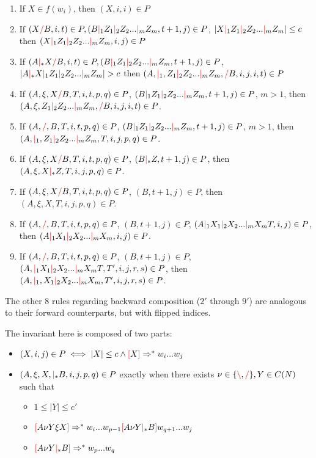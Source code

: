 \documentclass[12pt]{extarticle}
\theoremstyle{definition} \newtheorem{defn}{Definition}
\theoremstyle{definition} \newtheorem{prop}{Proposition}
\newcommand{\lc}{\textcolor{red}{\backslash}}
\newcommand{\rc}{\textcolor{red}{/}}
\newcommand{\mc}{\textcolor{red}{|}}
\newcommand{\lb}{\textcolor{red}{[}}
\newcommand{\rb}{\textcolor{red}{]}}
\begin{document}
\begin{enumerate}
    \item If $X \in f(w_i)$, then $(X, i, i) \in P$
    \item If $(X \rc B, i, t) \in P, (B \mc_1 Z_1 \mc_2 Z_2 ... \mc_m Z_m, t + 1, j) \in P$,
        $|X \mc_1 Z_1 \mc_2 Z_2 ... \mc_m Z_m| \leq c$
        then $(X \mc_1 Z_1 \mc_2 Z_2 ... \mc_m Z_m, i, j) \in P$
    \item If $(A \mc_* X \rc B, i, t) \in P, (B \mc_1 Z_1 \mc_2 Z_2 ... \mc_m Z_m, t + 1, j) \in P$,
        $|A \mc_* X \mc_1 Z_1 \mc_2 Z_2 ... \mc_m Z_m| > c$
        then $(A, \mc_1, Z_1 \mc_2 Z_2 ... \mc_m Z_m, \rc B, i, j, i, t) \in P$
    \item If $(A, \xi, X \rc B, T, i, t, p, q) \in P$,
        $(B \mc_1 Z_1 \mc_2 Z_2 ... \mc_m Z_m, t + 1, j) \in P$,
        $m > 1$, then $(A, \xi, Z_1 \mc_2 Z_2 ... \mc_m Z_m, \rc B, i, j, i, t) \in P$.
    \item If $(A, \rc, B, T, i, t, p, q) \in P$,
        $(B \mc_1 Z_1 \mc_2 Z_2 ... \mc_m Z_m, t + 1, j) \in P$,
        $m > 1$, then $(A, \mc_1, Z_1 \mc_2 Z_2 ... \mc_m Z_m, T, i, j, p, q) \in P$.
    \item If $(A, \xi, X \rc B, T, i, t, p, q) \in P$,
        $(B \mc_* Z, t + 1, j) \in P$,
        then $(A, \xi, X \mc_* Z, T, i, j, p, q) \in P$.
    \item If $(A, \xi, X \rc B, T, i, t, p, q) \in P$,
        $(B, t + 1, j) \in P$,
        then $(A, \xi, X, T, i, j, p, q) \in P$.
    \item If $(A, \rc, B, T, i, t, p, q) \in P$,
        $(B, t + 1, j) \in P$, $(A \mc_1 X_1 \mc_2 X_2 ... \mc_m X_m T, i, j) \in P$,
        then $(A \mc_1 X_1 \mc_2 X_2 ... \mc_m X_m, i, j) \in P$.
    \item If $(A, \rc, B, T, i, t, p, q) \in P$,
        $(B, t + 1, j) \in P$, $(A, \mc_1 X_1 \mc_2 X_2 ... \mc_m X_m T, T', i, j, r, s) \in P$,
        then $(A, \mc_1, X_1 \mc_2 X_2 ... \mc_m X_m, T', i, j, r, s) \in P$.
\end{enumerate}

The other 8 rules regarding backward composition
($2'$ through $9'$) are analogous to their forward counterparts, but with
flipped indices.

The invariant here is composed of two parts:

\begin{itemize}
    \item $(X, i, j) \in P \iff |X| \leq c \land \lb X \rb \Rightarrow^* w_i ... w_j$
    \item $(A, \xi, X, \mc_* B, i, j, p, q) \in P$
        exactly when there exists $\nu \in \{ \lc, \rc \}, Y \in C(N)$ such that
        \begin{itemize}
            \item $1 \leq |Y| \leq c'$
            \item $\lb A \nu Y \xi X \rb \Rightarrow^* w_i ... w_{p - 1} \lb A \nu Y \mc_* B \rb w_{q + 1} ... w_j$
            \item $\lb A \nu Y \mc_* B \rb \Rightarrow^* w_p ... w_q$
        \end{itemize}
\end{itemize}
\end{document}
